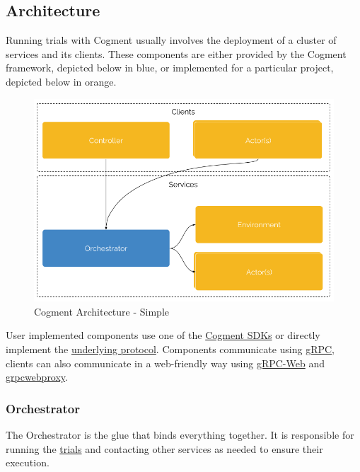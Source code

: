 \hypertarget{architecture}{%
\subsection{Architecture}\label{architecture}}

Running trials with Cogment usually involves the deployment of a cluster
of services and its clients. These components are either provided by the
Cogment framework, depicted below in blue, or implemented for a
particular project, depicted below in orange.

\begin{figure}
\centering
\includegraphics{./cogment_architecture_simple.png}
\caption{Cogment Architecture - Simple}
\end{figure}

User implemented components use one of the
\href{../cogment/cogment-api-guide.md}{Cogment SDKs} or directly
implement the
\href{../cogment/cogment-low-level-api-guide/overview.md}{underlying
protocol}. Components communicate using \href{https://grpc.io}{gRPC},
clients can also communicate in a web-friendly way using
\href{https://grpc.io/docs/platforms/web/}{gRPC-Web} and
\href{https://github.com/improbable-eng/grpc-web/tree/master/go/grpcwebproxy}{grpcwebproxy}.

\hypertarget{orchestrator}{%
\subsubsection{Orchestrator}\label{orchestrator}}

The Orchestrator is the glue that binds everything together. It is
responsible for running the \href{./glossary.md\#trial}{trials} and
contacting other services as needed to ensure their execution.

